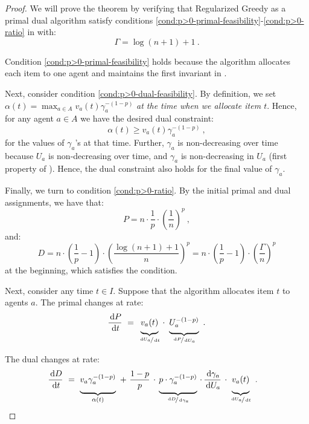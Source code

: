 \documentclass[11pt,letterpaper]{article}
\newcommand{\dif}[1]{\,\text{\rm d} #1}
\newcommand{\utility}{U}
\begin{document}
\begin{proof}We will prove the theorem by verifying that Regularized Greedy as a primal dual algorithm satisfy conditions \ref{cond:p>0-primal-feasibility}-\ref{cond:p>0-ratio} in  with:
	\[
		\Gamma=\log(n+1)+1
		~.
	\]
	
	Condition \ref{cond:p>0-primal-feasibility} holds because the algorithm allocates each item to one agent and maintains the first invariant in .

     Next, consider condition \ref{cond:p>0-dual-feasibility}. 
	By definition, we set $\alpha(t) = \max_{a \in A} v_a(t) \gamma_a^{-(1-p)}$ \emph{at the time when we allocate item $t$}.
	Hence, for any agent $a \in A$ we have the desired dual constraint:
	\[
		\alpha(t) \geq v_a(t)\gamma_a^{-(1-p)}
		~,
	\]
	for the values of $\gamma_a$'s at that time.
	Further, $\gamma_a$ is non-decreasing over time because $U_a$ is non-decreasing over time, and $\gamma_a$ is non-decreasing in $U_a$ (first property of ).
	Hence, the dual constraint also holds for the final value of $\gamma_a$.
	
	
	
	
	Finally, we turn to condition \ref{cond:p>0-ratio}. 
	By the initial primal and dual assignments, we have that:
	\[
		P = n\cdot \frac1p \cdot \left({\frac{1}{n}}\right)^p
		~,
	\]
	and:
	\[
		D = n\cdot \left(\frac1p -1\right) \cdot
	\left(\frac{\log(n+1)+1}{n}\right)^p = n\cdot \left(\frac1p -1\right) \cdot
	\left(\frac{\Gamma}{n}\right)^p
	\]
 	at the beginning, which satisfies the condition.
 	
	Next, consider any time $t \in I$.
	Suppose that the algorithm allocates item $t$ to agents $a$.
	The primal changes at rate:
	\begin{equation*}
		\frac{\dif{P}}{\dif{t}} ~=~ \underbrace{\vphantom{\Big|} v_a(t)}_{\nicefrac{\dif{\utility_a}}{\dif{t}}} \,\cdot~ \underbrace{\vphantom{\Big|} \utility_a^{-(1-p)}}_{\nicefrac{\dif{P}}{\dif{\utility_a}}}
		~.
	\end{equation*}

	The dual changes at rate:
	\begin{align*}
	\frac{\dif{D}}{\dif{t}}
	& ~=~ 
	\underbrace{\vphantom{\bigg|} v_a \gamma_a^{-(1-p)}}_{\alpha(t)}
	~+~ 
	\frac{1-p}{p} 
	\,\cdot\, 
	\underbrace{\vphantom{\bigg|} p \cdot \gamma_a^{-(1-p)}}_{\nicefrac{\dif{D}}{\dif{\gamma_a}}} 
	\,\cdot\,
	\frac{\dif{\gamma_a}}{\dif{\utility_a}}
	\,\cdot\,
	\underbrace{\vphantom{\bigg|} v_a(t)}_{\nicefrac{\dif{\utility_a}}{\dif{t}}} ~.
	\end{align*}
	

\end{proof}
\end{document}
